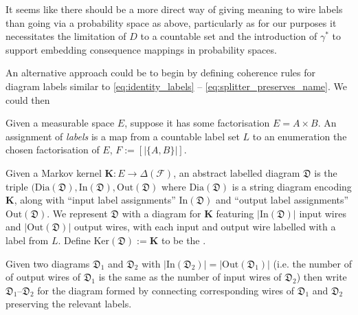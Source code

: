 It seems like there should be a more direct way of giving meaning to wire labels than going via a probability space as above, particularly as for our purposes it necessitates the limitation of $D$ to a countable set and the introduction of $\gamma^*$ to support embedding consequence mappings in probability spaces. 

An alternative approach could be to begin by defining coherence rules for diagram labels similar to \ref{eq:identity_labels} -- \ref{eq:splitter_preserves_name}. We could then 



\begin{definition}
Given a measurable space $E$, suppose it has some factorisation $E=A\times B$. An assignment of \emph{labels} is a map from a countable label set $L$ to an enumeration the chosen factorisation of $E$, $F:=[|\{A,B\}|]$. 

Given a Markov kernel $\mathbf{K}:E\to \Delta(\mathcal{F})$, an abstract labelled diagram $\mathfrak{D}$ is the triple $(\mathrm{Dia}(\mathfrak{D}),\mathrm{In}(\mathfrak{D}),\mathrm{Out}(\mathfrak{D})$ where $\mathrm{Dia}(\mathfrak{D})$ is a string diagram encoding $\mathbf{K}$, along with ``input label assignments'' $\mathrm{In}(\mathfrak{D})$ and ``output label assignments'' $\mathrm{Out}(\mathfrak{D})$. We represent $\mathfrak{D}$ with a diagram for $\mathbf{K}$ featuring $|\mathrm{In}(\mathfrak{D})|$ input wires and $|\mathrm{Out}(\mathfrak{D})|$ output wires, with each input and output wire labelled with a label from $L$. Define $\mathrm{Ker}(\mathfrak{D}):=\mathbf{K}$ to be the .

Given two diagrams $\mathfrak{D}_1$ and $\mathfrak{D}_2$ with $|\mathrm{In}(\mathfrak{D}_2)|=|\mathrm{Out}(\mathfrak{D}_1)|$ (i.e. the number of of output wires of $\mathfrak{D}_1$ is the same as the number of input wires of $\mathfrak{D}_2$) then write $\mathfrak{D}_1 \text{--} \mathfrak{D}_2$ for the diagram formed by connecting corresponding wires of $\mathfrak{D}_1$ and $\mathfrak{D}_2$ preserving the relevant labels.
\end{definition}

